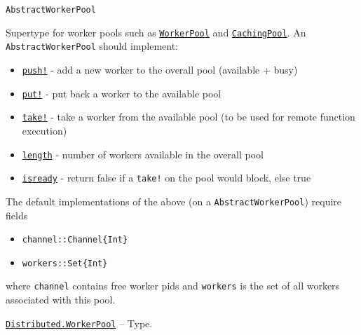 \begin{adjustwidth}{2em}{0pt}


\begin{verbatim}
AbstractWorkerPool
\end{verbatim}

Supertype for worker pools such as \hyperlink{17976394752057970100}{\texttt{WorkerPool}} and \hyperlink{8617353702639655725}{\texttt{CachingPool}}. An \texttt{AbstractWorkerPool} should implement:

\begin{itemize}
\item \hyperlink{18026893834387542681}{\texttt{push!}} - add a new worker to the overall pool (available + busy)


\item \hyperlink{10812715779190652189}{\texttt{put!}} - put back a worker to the available pool


\item \hyperlink{4963355246106153560}{\texttt{take!}} - take a worker from the available pool (to be used for remote function execution)


\item \hyperlink{9362803119463040896}{\texttt{length}} - number of workers available in the overall pool


\item \hyperlink{15888554370655089980}{\texttt{isready}} - return false if a \texttt{take!} on the pool would block, else true

\end{itemize}
The default implementations of the above (on a \texttt{AbstractWorkerPool}) require fields

\begin{itemize}
\item \texttt{channel::Channel\{Int\}}


\item \texttt{workers::Set\{Int\}}

\end{itemize}
where \texttt{channel} contains free worker pids and \texttt{workers} is the set of all workers associated with this pool.



\end{adjustwidth}
\hypertarget{17976394752057970100}{}
\hyperlink{17976394752057970100}{\texttt{Distributed.WorkerPool}}  -- {Type.}

